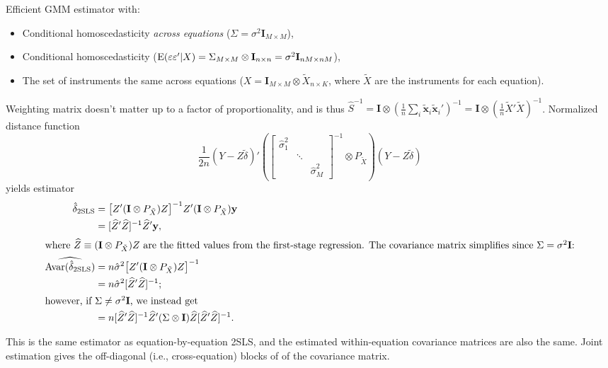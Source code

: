 \documentclass[8pt,letterpaper, landscape]{extarticle} %
\newcommand{\mx}{\ensuremath{\mathbf{x}}}
\newcommand{\mI}{\ensuremath{\mathbf{I}}}
\begin{document}
\begin{multicols}{3}
\begin{description}
Efficient GMM estimator with:
\begin{itemize}
\item Conditional homoscedasticity \textit{across equations} ($ \Sigma = \sigma^2 \mI_{M \times M} $),
\item Conditional homoscedasticity ($ \E (\epsilon \epsilon' | X) = \Sigma_{M \times M} \otimes \mI_{n \times n} = \sigma^2 \mI_{nM \times nM} $),
\item The set of instruments the same across equations ($ X = \mI_{M \times M} \otimes \tilde{X}_{n \times K} $, where $ \tilde{X} $ are the instruments for each equation).
\end{itemize}
Weighting matrix doesn't matter up to a factor of proportionality, and is thus $ \widehat{S}^{-1} = \mI \otimes (\tfrac{1}{n} \sum_{i} \tilde{\mx}_i \tilde{\mx}_{i}')^{-1} = \mI \otimes (\tfrac{1}{n} \tilde{X}' \tilde{X})^{-1} $. Normalized distance function
\[ \frac{1}{2n}(Y - Z \tilde{\delta})' \left(
\begin{bmatrix}
\hat{\sigma}_{1}^{2} & & \\
& \ddots & \\
& & \hat{\sigma}_{M}^{2}
\end{bmatrix}^{-1}
\otimes P_{\tilde{X}} \right) (Y - Z \tilde{\delta}) \]
yields estimator
\begin{align*}
\hat{\delta}_{\text{2SLS}} &= \bigl [ Z' (\mI \otimes P_{\tilde{X}}) Z \bigr ]^{-1} Z' (\mI \otimes P_{\tilde{X}}) \mathbf{y} \\
&= [\widehat{Z}' \widehat{Z} ]^{-1} \widehat{Z}' \mathbf{y} , \\
\intertext{where $ \widehat{Z} \equiv (\mI \otimes P_{\tilde{X}}) Z $ are the fitted values from the first-stage regression. The covariance matrix simplifies since $ \Sigma = \sigma^2 \mI $:}
\widehat{\Avar (\hat{\delta}_{\text{2SLS}})} &= n \hat{\sigma}^2 \bigl [ Z' (\mI \otimes P_{\tilde{X}}) Z \bigr]^{-1} \\
&= n \hat{\sigma}^2  [ \widehat{Z}' \widehat{Z} ]^{-1} ; \\
\intertext{however, if $ \Sigma \neq \sigma^2 \mI $, we instead get}
&= n [\widehat{Z}' \widehat{Z} ]^{-1} \widehat{Z}' (\Sigma \otimes \mI) \widehat{Z} [\widehat{Z}' \widehat{Z} ]^{-1} .
\end{align*}

This is the same estimator as equation-by-equation 2SLS, and the estimated within-equation covariance matrices are also the same. Joint estimation gives the off-diagonal (i.e., cross-equation) blocks of of the covariance matrix.



\end{description}
\end{multicols}
\end{document}
